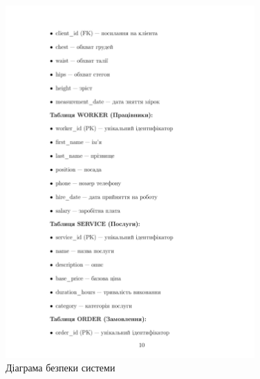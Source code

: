 \documentclass[14pt,a4paper]{extarticle}
\begin{document}
\begin{figure}[h!]
\centering
\includegraphics[width=0.85\textwidth]{diagrams/diagram-11.png}
\caption{Діаграма безпеки системи}
\end{figure}

\newpage
\end{document}
